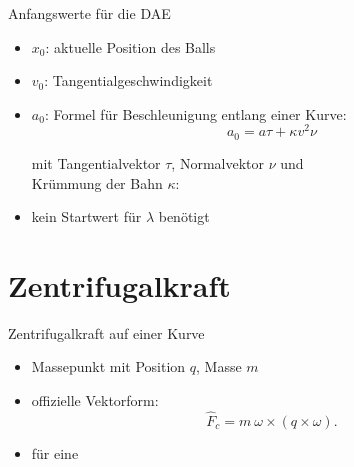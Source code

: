 \documentclass[aspectratio=169]{beamer}
\begin{document}
\begin{frame}{Anfangswerte für die DAE}

\begin{itemize}
	\item $x_0$: aktuelle Position des Balls
	\item $v_0$: Tangentialgeschwindigkeit
	\item $a_0$: Formel für Beschleunigung entlang einer Kurve:
	\[
	a_0 = a \tau + \kappa v^2 \nu
	\]

	\qquad mit Tangentialvektor $\tau$, Normalvektor $\nu$ und\\
	\qquad Krümmung der Bahn $\kappa$:

	\item kein Startwert für $\lambda$ benötigt
\end{itemize}

\end{frame}

\section{Zentrifugalkraft}

\begin{frame}{Zentrifugalkraft auf einer Kurve}
\begin{itemize}
    \item Massepunkt mit Position $q$, Masse $m$
    \item offizielle Vektorform:
        $$
        \hat{F}_c = m ~ \omega \times (q \times \omega).
        $$
    \item für eine
\end{itemize}
\end{frame}
\end{document}
